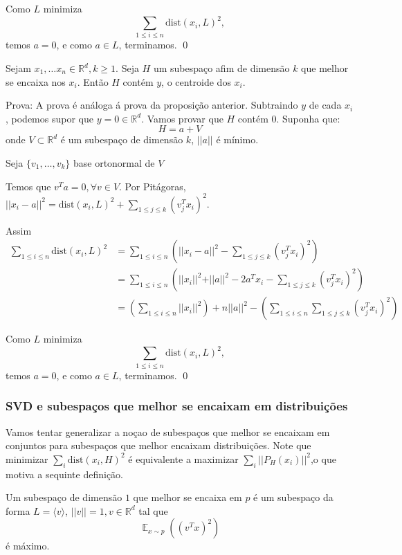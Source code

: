 Como $L$ minimiza 
\[\sum _{1\le i \le n} \text{dist}(x_i,L)^2,\]
temos $a=0$, e como $a\in L$, terminamos. \qed


\begin{proposicao} 
Sejam $x_1,\dots x_n \in \mathbb{R}^d, k \ge 1$. Seja $H$ um subespa\c{c}o afim de dimens\~ao $k$ que melhor se encaixa nos $x_i$. Ent\~ao $H$ cont\'em $y$, o centroide dos $x_i$.
\end{proposicao}
Prova: A prova \'e an\'aloga \'a prova da proposi\c{c}\~ao anterior. Subtraindo $y$ de cada $x_i$, podemos supor que $y=0\in \mathbb{R}^d$. Vamos provar que $H$ cont\'em $0$. Suponha que:
\[H = a + V\]
onde $V \subset \mathbb{R}^d$ \'e um subespa\c{c}o de dimens\~ao $k$, $\vert\vert a \vert \vert$ \'e m\'inimo.

Seja $\{v_1,\dots,v_k\}$ base ortonormal de $V$

Temos que $v^Ta=0,\forall v \in V$. Por Pit\'agoras, $\vert\vert x_i - a \vert \vert ^2 = \text{dist} (x_i,L)^2 + \displaystyle\sum_{1\le j \le k}(v_j^Tx_i)^2$.

Assim
\begin{align*}
\sum _{1\le i \le n} \text{dist}(x_i,L)^2&=\sum _{1\le i \le n} \left(\vert\vert x_i - a \vert \vert ^2 - \sum_{1\le j \le k}(v_j^Tx_i)^2\right)\\
										 &=\sum_{1\le i \le n} \left(\vert\vert x_i\vert \vert ^2 + \vert\vert a\vert \vert^2 - 2a^Tx_i - \sum_{1\le j \le k}(v_j^Tx_i)^2\right)\\ 
										 &= \left(\sum _{1\le i \le n} \vert\vert x_i\vert \vert ^2 \right)+ n \vert\vert a \vert \vert ^2 - \left(\sum _{1\le i \le n}\sum_{1\le j \le k}(v_j^Tx_i)^2\right)
\end{align*}

Como $L$ minimiza 
\[\sum _{1\le i \le n} \text{dist}(x_i,L)^2,\]
temos $a=0$, e como $a\in L$, terminamos. \qed

\subsubsection{SVD e subespa\c{c}os que melhor se encaixam em distribui\c{c}\~oes}
Vamos tentar generalizar a no\c{c}ao de subespa\c{c}os que melhor se encaixam em conjuntos para subespa\c{c}os que melhor encaixam distribui\c{c}\~oes. Note que minimizar $\displaystyle\sum_{i} \text{dist}(x_i,H)^2$ \'e equivalente a maximizar $\displaystyle\sum_{i} \vert\vert P_H(x_i)\vert\vert^2$,o que motiva a sequinte defini\c{c}\~ao.

\begin{definicao}
Um subespa\c{c}o de dimens\~ao $1$ que melhor se encaixa em $p$ \'e um subespa\c{c}o da forma $L = \langle v \rangle$, $\vert\vert v \vert\vert = 1, v \in \mathbb{R}^d$ tal que 
\[\displaystyle \mathop{\mathbb{E}}_{x \sim p} \left((v^Tx)^2\right)\]
\'e m\'aximo.
\end{definicao}

